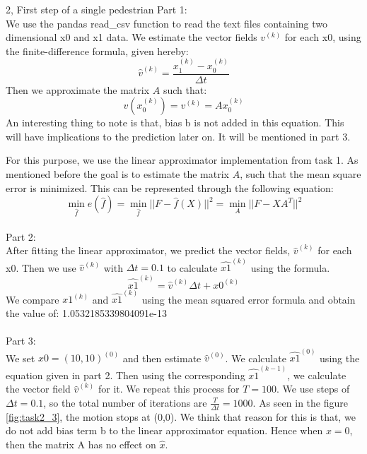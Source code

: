\documentclass[10pt,a4paper]{article}
\begin{document}
\begin{task}{2, First step of a single pedestrian}
Part 1: \\
We use the pandas read\_csv function to read the text files containing two dimensional x0 and x1 data. We estimate the vector fields $v^{(k)}$ for each x0, using the finite-difference formula, given hereby:
\begin{equation*}
\hat{v}^{(k)} = \frac{x_1^{(k)} - x_0^{(k)}}{\Delta t}
\end{equation*}
Then we approximate the matrix $A$ such that:
\begin{equation*}
v(x_0^{(k)}) = v^{(k)} = Ax_0^{(k)}
\end{equation*}
An interesting thing to note is that, bias b is not added in this equation. This will have implications to the prediction later on. It will be mentioned in part 3.

For this purpose, we use the linear approximator implementation from task 1. As mentioned before the goal is to estimate the matrix $A$, such that the mean square error is minimized. This can be represented through the following equation:
\begin{equation*}
\min_{\hat{f}}e(\hat{f}) = \min_{\hat{f}}||F-\hat{f}(X)||^2 = \min_{A}||F-XA^T||^2
\end{equation*} \\

Part 2: \\
After fitting the linear approximator, we predict the vector fields, $\hat{v}^{(k)}$ for each x0. Then we use $\hat{v}^{(k)}$ with $\Delta t = 0.1$ to calculate $\hat{x1}^{(k)}$ using the formula.
\begin{equation*}
\hat{x1}^{(k)} = \hat{v}^{(k)}\Delta t + x0^{(k)}
\end{equation*}
We compare $x1^{(k)}$ and $\hat{x1}^{(k)}$ using the mean squared error formula and obtain the value of: 1.0532185339804091e-13 \\\\
Part 3: \\
We set $x0=(10, 10)^{(0)}$ and then estimate $\hat{v}^{(0)}$. We calculate $\hat{x1}^{(0)}$ using the equation given in part 2. Then using the corresponding $\hat{x1}^{(k-1)}$, we calculate the vector field $\hat{v}^{(k)}$ for it. We repeat this process for $T = 100$. We use steps of $\Delta t = 0.1$, so the total number of iterations are $\frac{T}{\Delta t} = 1000$. 
As seen in the figure \ref{fig:task2_3}, the motion stops at (0,0). We think that reason for this is that, we do not add bias term b to the linear approximator equation. Hence when $x=0$, then the matrix A has no effect on $\hat{x}$.


\end{task}
\end{document}
